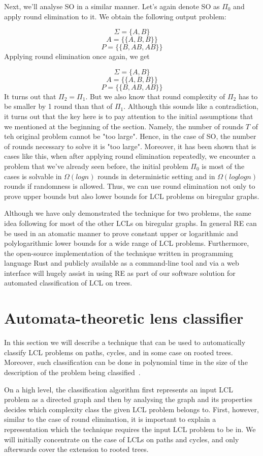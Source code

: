 Next, we'll analyse SO in a similar manner. Let's again denote SO as $\Pi_0$ and apply
round elimination to it. We obtain the following output problem:

$$\Sigma = \{A, B\}$$
$$A = \{ \{A, B, B\} \}$$
$$P = \{ \{B, AB, AB\}\}$$
Applying round elimination once again, we get

$$\Sigma = \{A, B\}$$
$$A = \{ \{A, B, B\} \}$$
$$P = \{ \{B, AB, AB\}\}$$
It turns out that $\Pi_2 = \Pi_1$. But we also know that round complexity of $\Pi_2$
has to be smaller by 1 round than that of $\Pi_1$. Although this sounds like a contradiction,
it turns out that the key here is to pay attention to the initial assumptions that we mentioned at the
beginning of the section. Namely, the number of rounds $T$ of teh original problem cannot be "too large".
Hence, in the case of SO, the number of rounds necessary to solve it is "too large". Moreover,
it has been shown that is cases like this, when after applying round elimination repeatedly,
we encounter a problem that we've already seen before, the initial problem $\Pi_0$ is most of the cases
is solvable in $\Omega(log n)$ rounds in deterministic setting and in $\Omega(loglog n)$ rounds
if randomness is allowed. Thus, we can use round elimination not only to prove upper bounds but
also lower bounds for LCL problems on biregular graphs.

Although we have only demonstrated the technique for two problems, the same idea following for most of the
other LCLs on biregular graphs. In general RE can be used in an atomatic manner to prove constant upper or
logarithmic and polylogarithmic lower bounds for a wide range of LCL problems. Furthermore, the open-source
implementation
of the technique written in programming language Rust and publicly available as a command-line tool and via
a web interface will hugely assist in using RE as part of our software solution for automated classification
of LCL on trees.

\section{Automata-theoretic lens classifier}

In this section we will describe a technique that can be used to automatically
classify LCL problems on paths, cycles, and in some case on rooted trees.
Moreover, such classification can be done in polynomial time in the size
of the description of the problem being classified~\cite{Chang2020}.

On a high level, the classification algorithm first represents an input LCL problem as
a directed graph and then by analysing the graph and its properties decides
which complexity class the given LCL problem belongs to. First, however, similar to
the case of round elimination, it is important to explain a representation which
the technique requires the input LCL problem to be in. We will initially concentrate on the case
of LCLs on paths and cycles, and only afterwards cover the extension to rooted trees.

